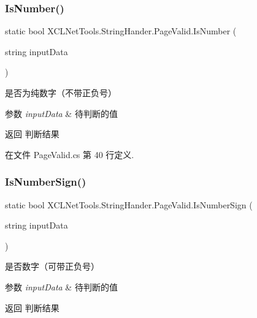 \subsubsection{\texorpdfstring{Is\+Number()}{IsNumber()}}
{\footnotesize\ttfamily static bool X\+C\+L\+Net\+Tools.\+String\+Hander.\+Page\+Valid.\+Is\+Number (\begin{DoxyParamCaption}\item[{string}]{input\+Data }\end{DoxyParamCaption})\hspace{0.3cm}{\ttfamily [static]}}



是否为纯数字（不带正负号） 


\begin{DoxyParams}{参数}
{\em input\+Data} & 待判断的值\\
\hline
\end{DoxyParams}
\begin{DoxyReturn}{返回}
判断结果
\end{DoxyReturn}


在文件 Page\+Valid.\+cs 第 40 行定义.

\mbox{\label{class_x_c_l_net_tools_1_1_string_hander_1_1_page_valid_a91c3575738db7370e02e7698ef909695}} 
\subsubsection{\texorpdfstring{Is\+Number\+Sign()}{IsNumberSign()}}
{\footnotesize\ttfamily static bool X\+C\+L\+Net\+Tools.\+String\+Hander.\+Page\+Valid.\+Is\+Number\+Sign (\begin{DoxyParamCaption}\item[{string}]{input\+Data }\end{DoxyParamCaption})\hspace{0.3cm}{\ttfamily [static]}}



是否数字（可带正负号） 


\begin{DoxyParams}{参数}
{\em input\+Data} & 待判断的值\\
\hline
\end{DoxyParams}
\begin{DoxyReturn}{返回}
判断结果
\end{DoxyReturn}


